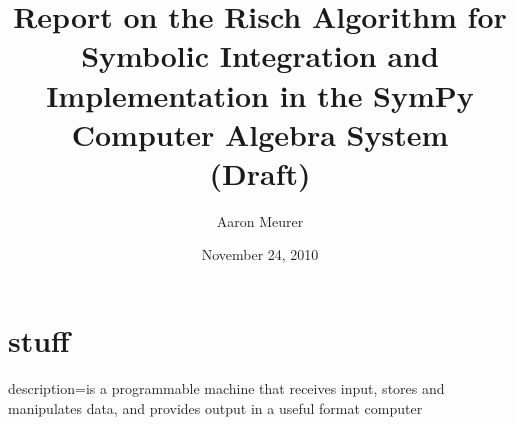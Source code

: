 \documentclass[12pt]{article}
\begin{document}
\title{Report on the Risch Algorithm for Symbolic
Integration and Implementation in the Sym\-Py Computer Algebra System \\(Draft)}
\author{Aaron Meurer}
\date{November 24, 2010}
\maketitle

\section{stuff}

%
%


{
  description={is a programmable machine that receives input,
               stores and manipulates data, and provides
               output in a useful format}
}
\makeglossaries
\gls{computer}

\printglossaries
 
\end{document}

